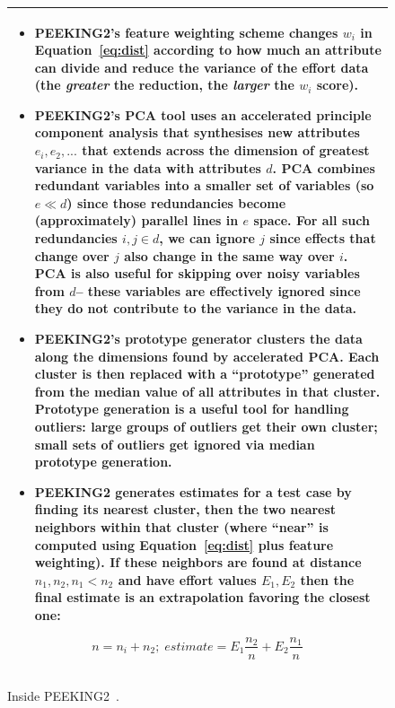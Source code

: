\documentclass[smallcondesed]{svjour3}
\newcommand{\bi}{\begin{itemize}[leftmargin=0.4cm]}
\newcommand{\ei}{\end{itemize}}
\newcommand{\fig}[1]{Figure~\ref{fig:#1}}
\newcommand{\eq}[1]{Equation~\ref{eq:#1}}
\begin{document}
\begin{figure}[!t]
\small
\begin{tabular}{|p{.95\linewidth}|}\hline
\bi
\item
PEEKING2's feature weighting scheme changes  $w_i$ in \eq{dist}  according to how much an attribute
can divide and reduce the variance of the effort data (the {\em greater} the reduction, the
{\em larger} the $w_i$ score).  
\item
PEEKING2's PCA tool uses an accelerated   principle component analysis that synthesises  new
attributes $e_i, e_2,...$
that extends across the dimension of greatest  variance in the data  with attributes $d$.  
PCA  combines
redundant  variables into a smaller set of variables  (so $e \ll d$) since those
redundancies become (approximately) parallel lines
in $e$ space. For all such redundancies \mbox{$i,j \in d$}, we 
can ignore $j$ 
since effects that change over $j$ also
change in the same way over $i$.
PCA is also useful for skipping over noisy variables from $d$-- these
variables are effectively ignored since    they  do not contribute to the variance in the data.
\item
PEEKING2's prototype generator  clusters the data along the dimensions
found by accelerated PCA. Each cluster is then replaced with a ``prototype'' generated from
the median value of all attributes in that cluster. Prototype generation is a useful tool for
handling outliers: large groups of outliers get their own cluster; small sets of outliers
get ignored via median prototype generation.
\item
PEEKING2 generates estimates for a test case by finding its nearest cluster,
then the two nearest neighbors within that cluster  (where ``near''
is computed using \eq{dist} plus feature weighting). If these neighbors are found at distance
$n_1,n_2, n_1 < n_2$ and have effort values $E_1,E_2$ then the final estimate is an extrapolation
favoring the closest one:
\ei
\[
n=n_i+n_2;\;\mathit{estimate}=E_1\frac{n_2}{n} + E_2\frac{n_1}{n}
\]\\\hline
\end{tabular} 
\caption{Inside PEEKING2~\cite{papa13}.}\label{fig:peeking}
\end{figure}




\end{document}
